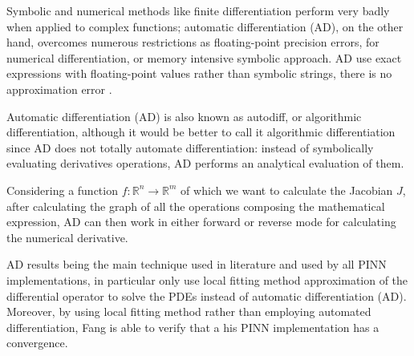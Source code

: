 \documentclass[pdflatex,sn-basic]{sn-jnl}%
\theoremstyle{thmstyleone}%
\theoremstyle{thmstyletwo}%
\theoremstyle{thmstylethree}%
\begin{document}
Symbolic and numerical methods like finite differentiation perform very badly when applied to complex functions; automatic differentiation (AD), on the other hand, overcomes numerous restrictions as floating-point precision errors, for numerical differentiation, or memory intensive symbolic approach.
AD use exact expressions with floating-point values rather than symbolic strings, there is no approximation error \citep{Wah2021_PinneikEikonalSolution_HagWHA}.

Automatic differentiation (AD) is also known as autodiff, or algorithmic differentiation, although it would be better to call it algorithmic differentiation since AD does not totally automate differentiation: instead of symbolically evaluating derivatives operations, AD performs an analytical evaluation of them.

Considering  a function
$f:\mathbb{R}^n\to\mathbb{R}^m$ of which we want to calculate the Jacobian $J$,  after calculating the graph of all the operations composing the mathematical expression, AD can then work in either forward or reverse mode for calculating the numerical derivative.



AD results being the main  technique used in literature and used by all PINN implementations, in particular only 
\cite{Fan2021_HighEfficientHybrid_Fan}
use local fitting method
approximation of the differential operator to solve the PDEs instead of automatic differentiation (AD).
Moreover, by using local fitting method rather than employing automated differentiation, Fang is able to verify that a his PINN implementation has a convergence.



\end{document}
